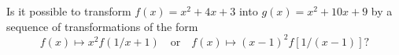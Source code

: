 Is it possible to transform $f(x) = x^2 + 4x + 3$ into $g(x) = x^2 + 10x + 9$ by a sequence of transformations of the form
\[ f(x) \mapsto x^2f(1/x + 1) \quad\text{or}\quad f(x) \mapsto (x - 1)^2f[1/(x - 1)]? \]
